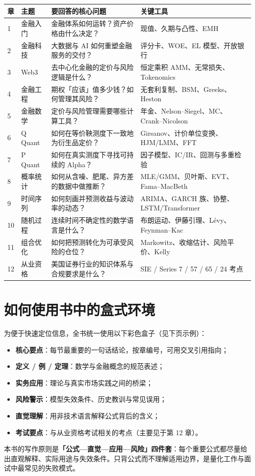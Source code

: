 \vspace{0.4em}
\begin{center}
\tablefont
\begin{tabularx}{\textwidth}{@{}C{1.1cm}L{2.7cm}Y L{3.1cm}@{}}
\toprule
\textbf{章} & \textbf{主题} & \textbf{要回答的核心问题} & \textbf{关键工具} \\
 & 金融入门 & 金融体系如何运转？资产价格由什么决定？ & 现值、久期与凸性、EMH \\
2 & 金融科技 & 大数据与 AI 如何重塑金融服务的交付？ & 评分卡、WOE、EL 模型、开放银行 \\
3 & Web3 & 去中心化金融的定价与风险逻辑是什么？ & 恒定乘积 AMM、无常损失、Tokenomics \\
4 & 金融工程 & 期权「应该」值多少钱？如何管理其风险？ & 无套利复制、BSM、Greeks、Heston \\
5 & 金融数学 & 定价与风险管理需要哪些计算工具？ & 年金、Nelson--Siegel、MC、Crank--Nicolson \\
6 & Q Quant & 如何在等价鞅测度下一致地为衍生品定价？ & Girsanov、计价单位变换、HJM/LMM、FFT \\
7 & P Quant & 如何在真实测度下寻找可持续的 Alpha？ & 因子模型、IC/IR、回测与多重检验 \\
8 & 概率统计 & 如何从含噪、肥尾、异方差的数据中做推断？ & MLE/GMM、贝叶斯、EVT、Fama--MacBeth \\
9 & 时间序列 & 如何刻画并预测收益与波动率的动态？ & ARIMA、GARCH 族、协整、LSTM/Transformer \\
10 & 随机过程 & 连续时间不确定性的数学语言是什么？ & 布朗运动、伊藤引理、L\'evy、Feynman--Kac \\
11 & 组合优化 & 如何把预测转化为可承受风险的仓位？ & Markowitz、收缩估计、风险平价、Kelly \\
12 & 从业资格 & 美国证券行业的知识体系与合规要求是什么？ & SIE / Series 7 / 57 / 65 / 24 考点 \\
\bottomrule
\end{tabularx}
\end{center}

\section*{如何使用书中的盒式环境}

为便于快速定位信息，全书统一使用以下彩色盒子（见下页示例）：

\begin{itemize}[leftmargin=1.8em]
  \item \textbf{核心要点}：每节最重要的一句话结论，按章编号，可用交叉引用指向；
  \item \textbf{定义 / 例 / 定理}：数学与金融概念的规范表述；
  \item \textbf{实务应用}：理论与真实市场实践之间的桥梁；
  \item \textbf{风险警示}：模型失效条件、历史教训与常见误用；
  \item \textbf{直觉理解}：用非技术语言解释公式背后的含义；
  \item \textbf{考试要点}：与从业资格考试相关的考点（主要见于第 12 章）。
\end{itemize}

\begin{keybox}
本书的写作原则是\textbf{「公式—直觉—应用—风险」四件套}：每个重要公式都尽量给出直观解释、实际用途与失效条件。只背公式而不理解适用边界，是量化工作与面试中最常见的失败模式。
\end{keybox}

\clearpage
